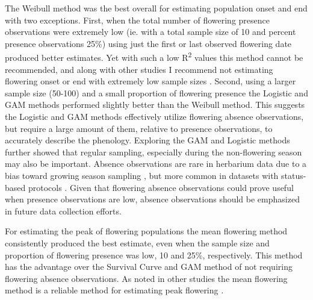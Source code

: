 The Weibull method was the best overall for estimating population onset and end with two exceptions. First, when the total number of flowering presence observations were extremely low (ie. with a total sample size of 10 and percent presence observations 25\%) using just the first or last observed flowering date produced better estimates. Yet with such a low R\textsuperscript{2} values this method cannot be recommended, and along with other studies I recommend not estimating flowering onset or end with extremely low sample sizes \citep{miller-rushing2008, moussus2010, bertin2015}. Second, using a larger sample size (50-100) and a small proportion of flowering presence the Logistic and GAM methods performed slightly better than the Weibull method. This suggests the Logistic and GAM methods effectively utilize flowering absence observations, but require a large amount of them, relative to presence observations, to accurately describe the phenology. Exploring the GAM and Logistic methods further showed that regular sampling, especially during the non-flowering season may also be important. Absence observations are rare in herbarium data due to a bias toward growing season sampling \citep{rich1992, daru2018}, but more common in datasets with status-based protocols \citep{denny2014, elmendorf2016}. Given that flowering absence observations could prove useful when presence observations are low, absence observations should be emphasized in future data collection efforts.

For estimating the peak of flowering populations the mean flowering method consistently produced the best estimate, even when the sample size and proportion of flowering presence was low, 10 and 25\%, respectively. This method has the advantage over the Survival Curve and GAM method of not requiring flowering absence observations. As noted in other studies the mean flowering method is a reliable method for estimating peak flowering \citep{miller-rushing2008, moussus2010, bertin2015}.


